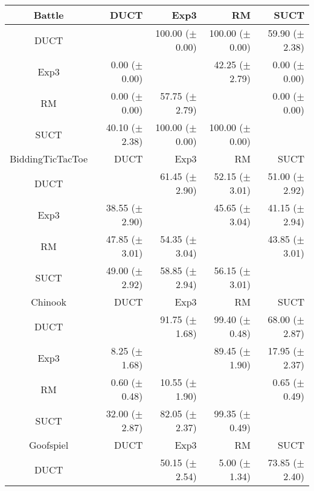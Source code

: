 \documentclass{article}
\begin{document}
\begin{table}
\begin{center}
\begin{tabular}{|c|rrrr|}


\hline
         Battle   &       DUCT   &       Exp3   &         RM   &       SUCT   \\
\hline
           DUCT    &              & 100.00 ($\pm$ 0.00)   & 100.00 ($\pm$ 0.00)   & 59.90 ($\pm$ 2.38)   \\
           Exp3    & 0.00 ($\pm$ 0.00)   &              & 42.25 ($\pm$ 2.79)   & 0.00 ($\pm$ 0.00)   \\
             RM    & 0.00 ($\pm$ 0.00)   & 57.75 ($\pm$ 2.79)   &              & 0.00 ($\pm$ 0.00)   \\
           SUCT    & 40.10 ($\pm$ 2.38)   & 100.00 ($\pm$ 0.00)   & 100.00 ($\pm$ 0.00)   &              \\
\hline
\hline
BiddingTicTacToe   &       DUCT   &       Exp3   &         RM   &       SUCT   \\
\hline
           DUCT    &              & 61.45 ($\pm$ 2.90)   & 52.15 ($\pm$ 3.01)   & 51.00 ($\pm$ 2.92)   \\
           Exp3    & 38.55 ($\pm$ 2.90)   &              & 45.65 ($\pm$ 3.04)   & 41.15 ($\pm$ 2.94)   \\
             RM    & 47.85 ($\pm$ 3.01)   & 54.35 ($\pm$ 3.04)   &              & 43.85 ($\pm$ 3.01)   \\
           SUCT    & 49.00 ($\pm$ 2.92)   & 58.85 ($\pm$ 2.94)   & 56.15 ($\pm$ 3.01)   &              \\
\hline
\hline
        Chinook   &       DUCT   &       Exp3   &         RM   &       SUCT   \\
\hline
           DUCT    &              & 91.75 ($\pm$ 1.68)   & 99.40 ($\pm$ 0.48)   & 68.00 ($\pm$ 2.87)   \\
           Exp3    & 8.25 ($\pm$ 1.68)   &              & 89.45 ($\pm$ 1.90)   & 17.95 ($\pm$ 2.37)   \\
             RM    & 0.60 ($\pm$ 0.48)   & 10.55 ($\pm$ 1.90)   &              & 0.65 ($\pm$ 0.49)   \\
           SUCT    & 32.00 ($\pm$ 2.87)   & 82.05 ($\pm$ 2.37)   & 99.35 ($\pm$ 0.49)   &              \\
\hline
\hline
      Goofspiel   &       DUCT   &       Exp3   &         RM   &       SUCT   \\
\hline
           DUCT    &              & 50.15 ($\pm$ 2.54)   & 5.00 ($\pm$ 1.34)   & 73.85 ($\pm$ 2.40)   \\

\end{tabular}
\end{center}
\end{table}
\end{document}
